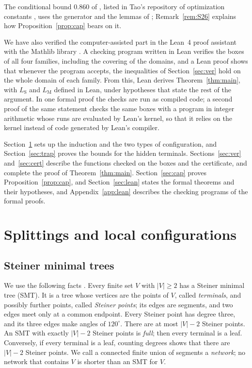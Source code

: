 \documentclass[11pt]{amsart}
\theoremstyle{definition}
\theoremstyle{remark}
\numberwithin{equation}{section}
\newcommand{\LS}{L_{\mathrm S}}
\newcommand{\LM}{L_{\mathrm M}}
\begin{document}
The conditional bound $0.860$ of \cite{S26}, listed in Tao's repository of optimization constants \cite{Tao}, uses the generator and the lemmas of \cite{KHSHGW}; Remark~\ref{rem:S26} explains how Proposition~\ref{prop:cap} bears on it.

We have also verified the computer-assisted part in the Lean~4 proof assistant \cite{Lean4} with the Mathlib library \cite{Mathlib}. A checking program written in Lean verifies the boxes of all four families, including the covering of the domains, and a Lean proof shows that whenever the program accepts, the inequalities of Section~\ref{sec:ver} hold on the whole domain of each family. From this, Lean derives Theorem~\ref{thm:main}, with $\LS$ and $\LM$ defined in Lean, under hypotheses that state the rest of the argument. In one formal proof the checks are run as compiled code; a second proof of the same statement checks the same boxes with a program in integer arithmetic whose runs are evaluated by Lean's kernel, so that it relies on the kernel instead of code generated by Lean's compiler.

Section~\ref{sec:red} sets up the induction and the two types of configuration, and Section~\ref{sec:trap} proves the bounds for the hidden terminals. Sections~\ref{sec:ver} and~\ref{sec:cert} describe the functions checked on the boxes and the certificate, and complete the proof of Theorem~\ref{thm:main}. Section~\ref{sec:cap} proves Proposition~\ref{prop:cap}, and Section~\ref{sec:lean} states the formal theorems and their hypotheses, and Appendix~\ref{app:lean} describes the checking programs of the formal proofs.

\section{Splittings and local configurations}\label{sec:red}

\subsection{Steiner minimal trees}
We use the following facts \cite{GP68}. Every finite set $V$ with $|V|\ge2$ has a Steiner minimal tree (SMT). It is a tree whose vertices are the points of $V$, called \emph{terminals}, and possibly further points, called \emph{Steiner points}; its edges are segments, and two edges meet only at a common endpoint. Every Steiner point has degree three, and its three edges make angles of $120^\circ$. There are at most $|V|-2$ Steiner points. An SMT with exactly $|V|-2$ Steiner points is \emph{full}; then every terminal is a leaf. Conversely, if every terminal is a leaf, counting degrees shows that there are $|V|-2$ Steiner points. We call a connected finite union of segments a \emph{network}; no network that contains $V$ is shorter than an SMT for $V$.
\end{document}
